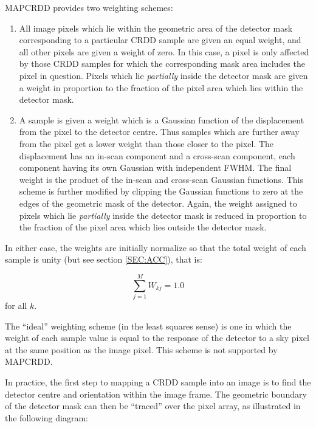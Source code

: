 MAPCRDD provides two weighting schemes:
\begin{enumerate}
\item All image pixels which lie within the geometric area of the detector mask
corresponding to a particular CRDD sample are given an equal weight, and all
other pixels are given a weight of zero. In this case, a pixel is only affected
by those CRDD samples for which the corresponding mask area includes the pixel
in question. Pixels which lie {\em partially} inside the detector mask are given
a weight in proportion to the fraction of the pixel area which lies within the
detector mask. 
\item A sample is given a weight which is a Gaussian function of the
displacement from the pixel to the detector centre. Thus samples which are
further away from the pixel get a lower weight than those closer to the pixel.
The displacement has an in-scan component and a cross-scan component, each
component having its own Gaussian with independent FWHM. The final weight is the
product of the in-scan and cross-scan Gaussian functions. This scheme is further
modified by clipping the Gaussian functions to zero at the edges of the
geometric mask of the detector. Again, the weight assigned to pixels which lie
{\em partially} inside the detector mask is reduced in proportion to the
fraction of the pixel area which lies outside the detector mask. 

\end{enumerate}

In either case, the weights are initially normalize so that the total weight of
each sample is unity (but see section \ref {SEC:ACC}), that is: 

\begin{equation}
\sum_{j=1}^{M}W_{kj}=1.0
\label {EQ:WS}
\end{equation}
for all $k$.

The ``ideal'' weighting scheme (in the least squares sense) is one in which the
weight of each sample value is equal to the response of the detector to a sky
pixel at the same position as the image pixel. This scheme is not supported by 
MAPCRDD.

In practice, the first step to mapping a CRDD sample into an image is to find
the detector centre and orientation within the image frame. The geometric 
boundary of the detector mask can then be ``traced'' over the pixel array, as 
illustrated in the following diagram:


